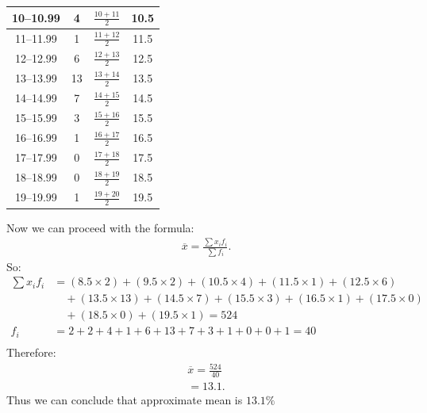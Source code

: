 \documentclass{report}
\begin{document}
\begin{mdframed}
\begin{center}
\begin{tabular}{|c|c|c|c|}
                    10--10.99 & 4 & $\frac{10 + 11}{2}$ & 10.5 \\
                    \hline
                    11--11.99 & 1 & $\frac{11 + 12}{2}$ & 11.5 \\
                    \hline
                    12--12.99 & 6 & $\frac{12 + 13}{2}$ & 12.5 \\
                    \hline
                    13--13.99 & 13 & $\frac{13 + 14}{2}$ & 13.5 \\
                    \hline
                    14--14.99 & 7 & $\frac{14 + 15}{2}$ & 14.5 \\
                    \hline
                    15--15.99 & 3 & $\frac{15 + 16}{2}$ & 15.5 \\
                    \hline
                    16--16.99 & 1 & $\frac{16 + 17}{2}$ & 16.5 \\
                    \hline
                    17--17.99 & 0 & $\frac{17 + 18}{2}$ & 17.5 \\
                    \hline
                    18--18.99 & 0 & $\frac{18 + 19}{2}$ & 18.5 \\
                    \hline
                    19--19.99 & 1 & $\frac{19 + 20}{2}$ & 19.5 \\
                    \hline
                    \end{tabular}
           \end{center}
           \bigbreak \noindent 
           Now we can proceed with the formula:
           \begin{align*}
               \overline{x} = \frac{\sum x_{i}f_{i}}{\sum f_{i}} 
           .\end{align*}
           \bigbreak \noindent 
           So:
           \begin{align*}
                   \sum x_{i}f_{i} &= (8.5 \times 2) + (9.5 \times 2) + (10.5 \times 4) + (11.5 \times 1) + (12.5 \times 6) \\
                &\quad+ (13.5 \times 13) + (14.5 \times 7) + (15.5 \times 3) + (16.5 \times 1) + (17.5 \times 0) \\
                &\quad+ (18.5 \times 0) + (19.5 \times 1) = 524 \\
                f_{i} &= 2 + 2 + 4 + 1 + 6 + 13 + 7 + 3 + 1 + 0 + 0 + 1 = 40 \\
            \end{align*}
            \bigbreak \noindent 
            Therefore:
            \begin{align*}
                \overline{x} = \frac{524}{40} \\
                =13.1
            .\end{align*}
            \bigbreak \noindent 
            Thus we can conclude that approximate mean is $13.1\%$
         \end{mdframed}
\end{document}
